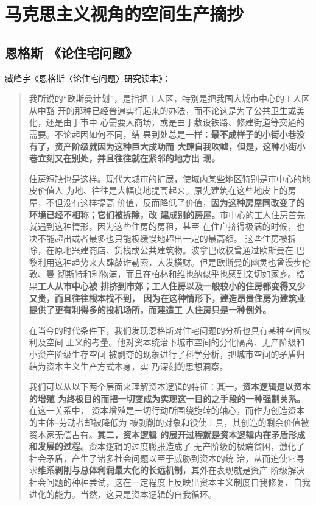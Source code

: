 \chapter{马克思主义视角的空间生产摘抄}

\section{恩格斯 《论住宅问题》}

臧峰宇《恩格斯〈论住宅问题〉研究读本》：
\begin{quotation}
  我所说的“欧斯曼计划”，是指把工人区，特别是把我国大城市中心的工人区从中豁
  开的那种已经普遍实行起来的办法，而不论这是为了公共卫生或美化，还是由于市中
  心需要大商场，或是由于敷设铁路、修建街道等交通的需要。不论起因如何不同，结
  果到处总是一样：\textbf{最不成样子的小街小巷没有了，资产阶级就因为这种巨大成功而
    大肆自我吹嘘，但是，这种小街小巷立刻又在别处，并且往往就在紧邻的地方出
    现。}\cite[243]{maenwen3}

  住房短缺也是这样。现代大城市的扩展，使城内某些地区特别是市中心的地皮价值人
  为地、往往是大幅度地提高起来。原先建筑在这些地皮上的房屋，不但没有这样提高
  价值，反而降低了价值，\textbf{因为这种房屋同改变了的环境已经不相称；它们被拆除，改
  建成别的房屋。}市中心的工人住房首先就遇到这种情形，因为这些住房的房租，甚至
  在住户挤得极满的时候，也决不能超出或者最多也只能极缓慢地超出一定的最高额。
  这些住房被拆除，在原地兴建商店、货栈或公共建筑物。波拿巴政权曾通过欧斯曼在
  巴黎利用这种趋势来大肆敲诈勒索，大发横财。但是欧斯曼的幽灵也曾漫步伦敦、曼
  彻斯特和利物浦，而且在柏林和维也纳似乎也感到亲切如家乡。结果\textbf{工人从市中心被
  排挤到市郊；工人住房以及一般较小的住房都变得又少又贵，而且往往根本找不到，
  因为在这种情形下，建造昂贵住房为建筑业提供了更有利得多的投机场所，而建造工
  人住房只是一种例外。}\cite[193]{maenwen3}

  在当今的时代条件下，我们发现恩格斯对住宅问题的分析也具有某种空间权利及空间
  正义的考量。他对资本统治下城市空间的分化隔离、无产阶级和小资产阶级生存空间
  被剥夺的现象进行了科学分析，把城市空间的矛盾归结为资本主义生产方式本身，实
  乃深刻的思想洞察。\cite[74]{zhuzhaiwenti}

  我们可以从以下两个层面来理解资本逻辑的特征：\textbf{其一，资本逻辑是以资本的增殖
    为终极目的而把一切变成为实现这一目的之手段的一种强制关系。}在这一关系中，
  资本增殖是一切行动所围绕旋转的轴心，而作为创造资本的主体--劳动者却被降低为
  被剥削的对象和役使工具，其创造的剩余价值被资本家无偿占有。\textbf{其二，资本逻辑
    的展开过程就是资本逻辑内在矛盾形成和发展的过程。}资本逻辑的过度膨胀造成了
  无产阶级的极端贫困，激化了社会矛盾，产生了诸多社会问题以至于威胁到资本的统
  治，从而迫使它寻求\textbf{维系剥削与总体利润最大化的长远机制}，其外在表现就是资产
  阶级解决社会问题的种种尝试，这在一定程度上反映出资本主义制度自我修复、自我
  进化的能力。当然，这只是资本逻辑的自我循环。


\end{quotation}
